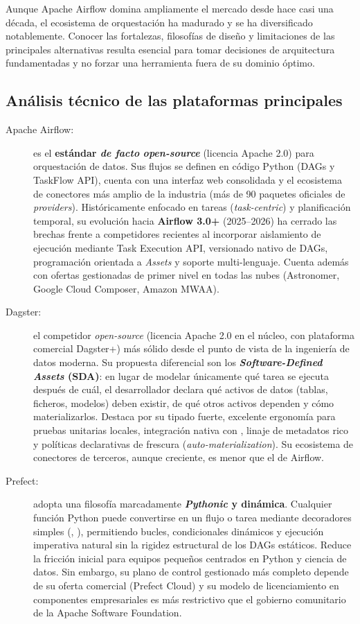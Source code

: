 Aunque Apache Airflow domina ampliamente el mercado desde hace casi una década, el ecosistema de orquestación ha madurado y se ha diversificado notablemente. Conocer las fortalezas, filosofías de diseño y limitaciones de las principales alternativas resulta esencial para tomar decisiones de arquitectura fundamentadas y no forzar una herramienta fuera de su dominio óptimo.

\subsection{Análisis técnico de las plataformas principales}\label{subsec:analisis-plataformas}

\begin{description}
  \item[Apache Airflow:] es el \textbf{estándar \textit{de facto} \textit{open-source}} (licencia Apache 2.0) para orquestación de datos. Sus flujos se definen en código Python (DAGs y TaskFlow API), cuenta con una interfaz web consolidada y el ecosistema de conectores más amplio de la industria (más de 90 paquetes oficiales de \textit{providers}). Históricamente enfocado en tareas (\textit{task-centric}) y planificación temporal, su evolución hacia \textbf{Airflow 3.0+} (2025--2026) ha cerrado las brechas frente a competidores recientes al incorporar aislamiento de ejecución mediante Task Execution API, versionado nativo de DAGs, programación orientada a \textit{Assets} y soporte multi-lenguaje. Cuenta además con ofertas gestionadas de primer nivel en todas las nubes (Astronomer, Google Cloud Composer, Amazon MWAA).

  \item[Dagster:] el competidor \textit{open-source} (licencia Apache 2.0 en el núcleo, con plataforma comercial Dagster+) más sólido desde el punto de vista de la ingeniería de datos moderna. Su propuesta diferencial son los \textbf{\textit{Software-Defined Assets} (SDA)}: en lugar de modelar únicamente qué tarea se ejecuta después de cuál, el desarrollador declara qué activos de datos (tablas, ficheros, modelos) deben existir, de qué otros activos dependen y cómo materializarlos. Destaca por su tipado fuerte, excelente ergonomía para pruebas unitarias locales, integración nativa con , linaje de metadatos rico y políticas declarativas de frescura (\textit{auto-materialization}). Su ecosistema de conectores de terceros, aunque creciente, es menor que el de Airflow.

  \item[Prefect:] adopta una filosofía marcadamente \textbf{\textit{Pythonic} y dinámica}. Cualquier función Python puede convertirse en un flujo o tarea mediante decoradores simples (, ), permitiendo bucles, condicionales dinámicos y ejecución imperativa natural sin la rigidez estructural de los DAGs estáticos. Reduce la fricción inicial para equipos pequeños centrados en Python y ciencia de datos. Sin embargo, su plano de control gestionado más completo depende de su oferta comercial (Prefect Cloud) y su modelo de licenciamiento en componentes empresariales es más restrictivo que el gobierno comunitario de la Apache Software Foundation.


\end{description}
